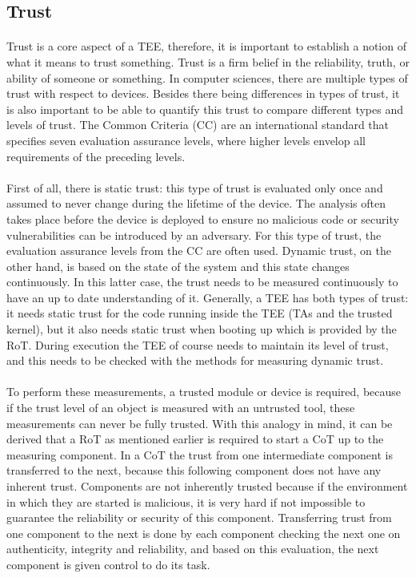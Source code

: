 \subsection*{Trust}

\paragraph*{}
Trust is a core aspect of a TEE, therefore, it is important to establish a notion of what it means to trust something. Trust is a firm belief in the reliability, truth, or ability of someone or something. In computer sciences, there are multiple types of trust with respect to devices. Besides there being differences in types of trust, it is also important to be able to quantify this trust to compare different types and levels of trust. The Common Criteria (CC) \cite{trust} are an international standard that specifies seven evaluation assurance levels, where higher levels envelop all requirements of the preceding levels.

\paragraph*{}
First of all, there is static trust: this type of trust is evaluated only once and assumed to never change during the lifetime of the device. The analysis often takes place before the device is deployed to ensure no malicious code or security vulnerabilities can be introduced by an adversary. For this type of trust, the evaluation assurance levels from the CC are often used. Dynamic trust, on the other hand, is based on the state of the system and this state changes continuously. In this latter case, the trust needs to be measured continuously to have an up to date understanding of it. Generally, a TEE has both types of trust: it needs static trust for the code running inside the TEE (TAs and the trusted kernel), but it also needs static trust when booting up which is provided by the RoT. During execution the TEE of course needs to maintain its level of trust, and this needs to be checked with the methods for measuring dynamic trust.

\paragraph*{}
To perform these measurements, a trusted module or device is required, because if the trust level of an object is measured with an untrusted tool, these measurements can never be fully trusted. With this analogy in mind, it can be derived that a RoT as mentioned earlier is required to start a CoT up to the measuring component. In a CoT the trust from one intermediate component is transferred to the next, because this following component does not have any inherent trust. Components are not inherently trusted because if the environment in which they are started is malicious, it is very hard if not impossible to guarantee the reliability or security of this component. Transferring trust from one component to the next is done by each component checking the next one on authenticity, integrity and reliability, and based on this evaluation, the next component is given control to do its task. 

